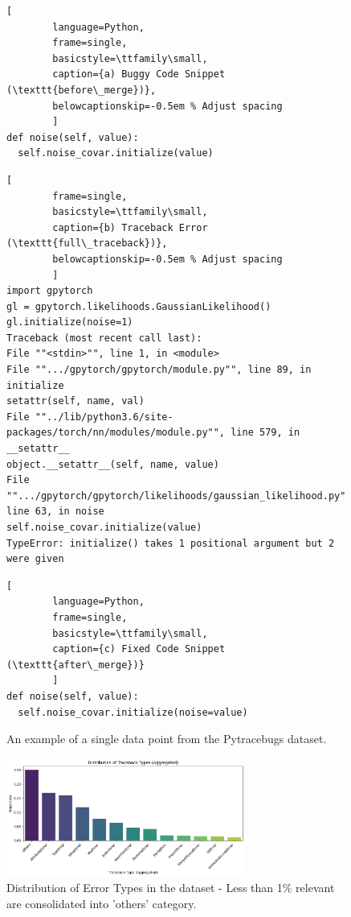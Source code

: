\begin{figure}[h!]
    \centering
    \caption{An example of a single data point from the Pytracebugs dataset.}
    \label{fig:dataset-example}

    \begin{lstlisting}[
        language=Python,
        frame=single,
        basicstyle=\ttfamily\small,
        caption={a) Buggy Code Snippet (\texttt{before\_merge})},
        belowcaptionskip=-0.5em % Adjust spacing
        ]
def noise(self, value):
  self.noise_covar.initialize(value)
    \end{lstlisting}

    \begin{lstlisting}[
        frame=single,
        basicstyle=\ttfamily\small,
        caption={b) Traceback Error (\texttt{full\_traceback})},
        belowcaptionskip=-0.5em % Adjust spacing
        ]
import gpytorch
gl = gpytorch.likelihoods.GaussianLikelihood()
gl.initialize(noise=1)
Traceback (most recent call last):
File ""<stdin>"", line 1, in <module>
File "".../gpytorch/gpytorch/module.py"", line 89, in initialize
setattr(self, name, val)
File ""../lib/python3.6/site-packages/torch/nn/modules/module.py"", line 579, in __setattr__
object.__setattr__(self, name, value)
File "".../gpytorch/gpytorch/likelihoods/gaussian_likelihood.py"", line 63, in noise
self.noise_covar.initialize(value)
TypeError: initialize() takes 1 positional argument but 2 were given
    \end{lstlisting}

    \begin{lstlisting}[
        language=Python,
        frame=single,
        basicstyle=\ttfamily\small,
        caption={c) Fixed Code Snippet (\texttt{after\_merge})}
        ]
def noise(self, value):
  self.noise_covar.initialize(noise=value)
    \end{lstlisting}
\end{figure}

\begin{figure}[h!]
    \centering
    \includegraphics[width=0.7\textwidth]{Cap2/dataset-traceback-type.png}
    \caption{Distribution of Error Types in the dataset - Less than 1\% relevant are consolidated into 'others' category.}
    \label{fig:dataset-traceback-types}
\end{figure}


